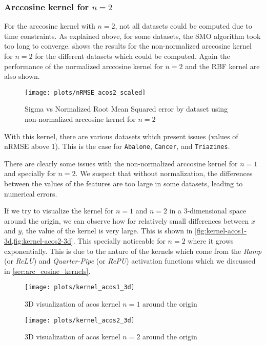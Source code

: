 \subsubsection{Arccosine kernel for $n=2$}

For the arccosine kernel with $n=2$, not all datasets could be computed due to
time constraints. As explained above, for some datasets, the SMO algorithm
took too long to converge.  shows the results for
the non-normalized arccosine kernel for $n=2$ for the different datasets which
could be computed. Again the performance of the normalized arccosine kernel for
$n=2$ and the RBF kernel are also shown.

\begin{figure}[H]
    \texttt{[image: plots/nRMSE\_acos2\_scaled]}
    \caption{Sigma vs Normalized Root Mean Squared error by dataset using non-normalized arccosine kernel for $n=2$}%
    \label{fig:nrmse-acos2-scaled}
\end{figure}

With this kernel, there are various datasets which present issues (values of nRMSE
above 1). This is the case for \texttt{Abalone}, \texttt{Cancer}, and \texttt{Triazines}.

There are clearly some issues with the non-normalized arccosine kernel for $n=1$ and
specially for $n=2$. We suspect that without normalization, the differences between
the values of the features are too large in some datasets, leading to numerical errors.

If we try to visualize the kernel for $n=1$ and $n=2$ in a 3-dimensional space around
the origin, we can observe how for relatively small differences between $x$ and $y$,
the value of the kernel is very large. This is shown in \cref{fig:kernel-acos1-3d,fig:kernel-acos2-3d}.
This specially noticeable for $n=2$ where it grows exponentially. This is due to the
nature of the kernels which come from the \emph{Ramp} (or \emph{ReLU}) and
\emph{Quarter-Pipe} (or \emph{RePU}) activation functions which we discussed in
\cref{sec:arc_cosine_kernels}.

\begin{figure}[H]
    \texttt{[image: plots/kernel\_acos1\_3d]}
    \caption{3D visualization of acos kernel $n=1$ around the origin}
    \label{fig:kernel-acos1-3d}
\end{figure}

\begin{figure}[H]
    \texttt{[image: plots/kernel\_acos2\_3d]}
    \caption{3D visualization of acos kernel $n=2$ around the origin}
    \label{fig:kernel-acos2-3d}
\end{figure}
